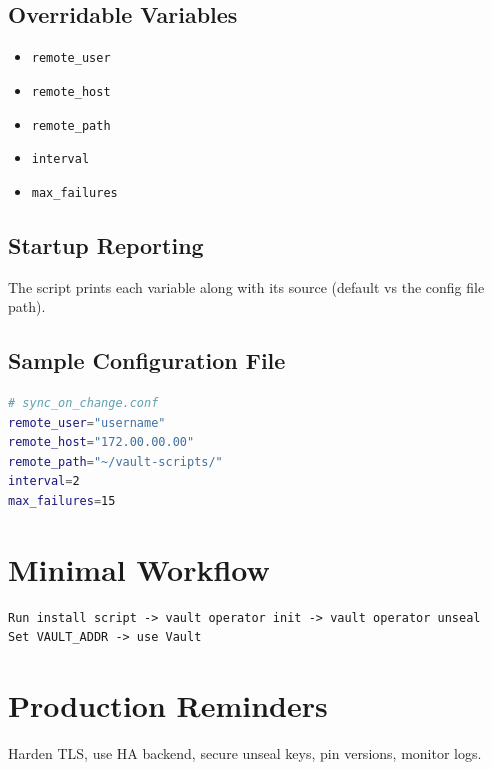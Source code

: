 \documentclass[12pt]{article}
\begin{document}
\subsection*{Overridable Variables}
\begin{itemize}
  \item \texttt{remote\_user}
  \item \texttt{remote\_host}
  \item \texttt{remote\_path}
  \item \texttt{interval}
  \item \texttt{max\_failures}
\end{itemize}

\subsection*{Startup Reporting}
The script prints each variable along with its source (default vs the config file path).

\subsection*{Sample Configuration File}
\begin{lstlisting}[language=bash]
# sync_on_change.conf
remote_user="username"
remote_host="172.00.00.00"
remote_path="~/vault-scripts/"
interval=2
max_failures=15
\end{lstlisting}

\section{Minimal Workflow}
\begin{verbatim}
Run install script -> vault operator init -> vault operator unseal
Set VAULT_ADDR -> use Vault
\end{verbatim}

\section{Production Reminders}
Harden TLS, use HA backend, secure unseal keys, pin versions, monitor logs.
\end{document}
